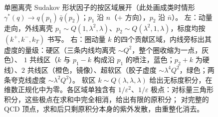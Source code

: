 \begin{figure}[htbp]
\caption{单圈离壳 Sudakov 形状因子的按区域展开（此处画成类时情形 $\gamma^*(q)\to q(p_1)\,\bar q(p_2)$；$p_1$ 沿 $n$（$+$ 方向），$p_2$ 沿 $\bar n$）。
左：动量走向，外线离壳 $p_1\sim Q(1,\lambda^2,\lambda)$、$p_2\sim Q(\lambda^2,1,\lambda)$，标度均按 $(k^+,k^-,k_T)$ 书写。
右：圈动量 $k$ 的四个贡献区域，内线旁标出其虚度的量级：硬区（三条内线均离壳 $\sim Q^2$，整个圈收缩为一点，灰色）、
$1$ 共线区（$k$ 与 $p_1-k$ 构成沿 $p_1$ 的喷注，蓝色；$p_2+k$ 为硬线）、$2$ 共线区（橙色，镜像）、超软区（胶子虚度 $\sim\lambda^4Q^2$，绿色；两条夸克线虚度 $\sim\lambda^2Q^2$）。
软区 $k\sim Q(\lambda,\lambda,\lambda)$ 给出无标度积分，在维数正规化中为零。各区域单独含有 $1/\varepsilon^2$、$1/\varepsilon$ 极点：对标量三角形积分，这些极点在求和中完全相消，给出有限的原积分；
对完整的 QCD 顶点，求和后只剩原积分本身的紫外发散，由重整化消去。}
\label{fig:sudakov-ff}
\end{figure}

